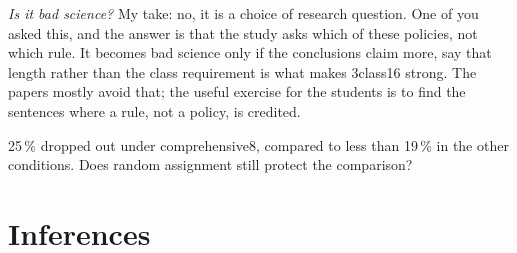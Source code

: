 \begin{frame}
{    \emph{Is it bad science?}
    My take: no, it is a choice of research question.
    One of you asked this, and the answer is that the study asks which of
    these policies, not which rule.
    It becomes bad science only if the conclusions claim more, say that
    length rather than the class requirement is what makes 3class16
    strong.
    The papers mostly avoid that; the useful exercise for the students is
    to find the sentences where a rule, not a policy, is credited.
  }
\end{frame}

\begin{frame}
  \begin{question}
    25\,\% dropped out under comprehensive8, compared to less than 19\,\%
    in the other conditions\autocite{OfPasswordsAndPeople}.
    Does random assignment still protect the comparison?
  \end{question}

\end{frame}

\section{Inferences}

